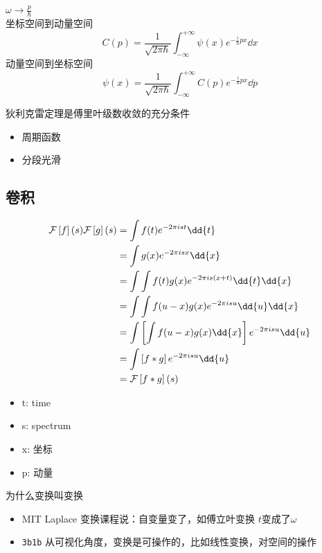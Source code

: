 \(\omega \to \frac{p}{\hbar}\) \\
坐标空间到动量空间
\begin{equation*}
	C(p)
	=
	\frac{1}{\sqrt{2 \pi \hbar}}
	\int_{-\infty}^{+\infty}
	\psi(x)
	e^{- \frac{i}{\hbar} p x}  \dd x
\end{equation*}
动量空间到坐标空间
\begin{equation*}
	\psi(x)
	=
	\frac{1}{\sqrt{2 \pi \hbar}}
	\int_{-\infty}^{+\infty}
	C(p)
	e^{- \frac{i}{\hbar} p x} \dd p
\end{equation*}

\begin{theorem}[狄利克雷定理]
	狄利克雷定理是傅里叶级数收敛的充分条件
	\begin{itemize}
		\item 周期函数
		\item 分段光滑
	\end{itemize}
\end{theorem}

\subsection{卷积}
\begin{equation}
  \begin{aligned}
     \fourier{f}(s) \fourier{g}(s)
    &= \int f(t) e^{- 2 \pi ist} \dd{t}\\
    &=\int g(x) e^{- 2 \pi i sx} \dd{x} \\
    &= \int \int f(t) g(x) e^{- 2 \pi i s(x+t)} \dd{t} \dd{x} \\
    &= \int \int f(u-x) g(x) e^{- 2 \pi i s u} \dd{u} \dd{x} \\
    &= \int \left[\int f(u-x) g(x) \dd{x}\right] e^{- 2 \pi i s u} \dd{u} \\
    &= \int  \left[f*g\right] e^{- 2 \pi i s u} \dd{u} \\
    &= \fourier{f*g}(s)
  \end{aligned}
\end{equation}
\begin{remark}
  \begin{itemize}
    \item   t: time
    \item s: spectrum
    \item x: 坐标
    \item p: 动量
  \end{itemize}
\end{remark}

\begin{remark}
为什么变换叫变换
\begin{itemize}
  \item MIT Laplace 变换课程说：自变量变了，如傅立叶变换 \(t\)变成了\(\omega\)
  \item \verb|3b1b| 从可视化角度，变换是可操作的，比如线性变换，对空间的操作
\end{itemize}
\end{remark}

